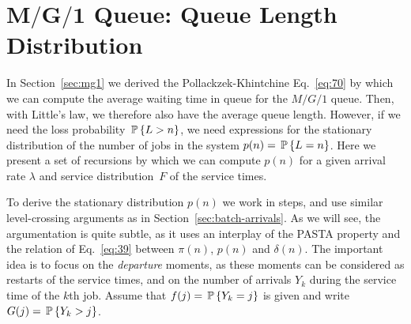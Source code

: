 \section
[$M/G/1$ Queue: Queue Length Distribution]
{$\mathbf{M/G/1}$ Queue: Queue Length Distribution}
\label{sec:distr-queue-length}

In Section~\ref{sec:mg1} we derived the Pollackzek-Khintchine
Eq.~\eqref{eq:70} by which we can compute the average waiting time in
queue for the $M/G/1$ queue. Then, with Little's law, we therefore
also have the average queue length. However, if we need the loss
probability $\P{L>n}$, we need expressions for the stationary
distribution of the number of jobs in the system $p(n)=\P{L=n}$.  Here
we present a set of recursions by which we can compute $p(n)$ for
a given arrival rate $\lambda$ and service distribution~$F$ of the
service times.

To derive the stationary distribution $p(n)$ we work in steps, and use
similar level-crossing arguments as in
Section~\ref{sec:batch-arrivals}.  As we will see, the argumentation
is quite subtle, as it uses an interplay of the PASTA property and the
relation of Eq.~\eqref{eq:39} between $\pi(n)$, $p(n)$ and
$\delta(n)$. The important idea is to focus on the \emph{departure}
moments, as these moments can be considered as restarts of the service
times, and on the number of arrivals $Y_k$ during the service time of
the $k$th job.  Assume that $f(j) = \P{Y_k = j}$ is given and write
$G(j) = \P{Y_k > j}$.



